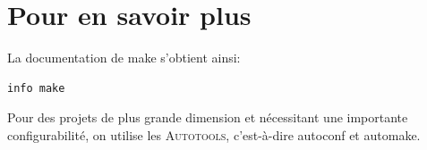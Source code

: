 \documentclass[11pt,a4paper]{article}
\newcommand{\must}{\noindent $\triangleright$ \xspace}
\newcommand{\bitem}{\item[$\bullet$]}
\begin{document}















\section{Pour en savoir plus}

\noindent La documentation de make s'obtient ainsi:
{\small
\begin{verbatim}
info make
\end{verbatim}
}
\noindent Pour des projets de plus grande dimension et nécessitant une
importante configurabilité, on utilise les \textsc{Autotools},
c'est-à-dire \textsf{autoconf} et \textsf{automake}.
\end{document}

